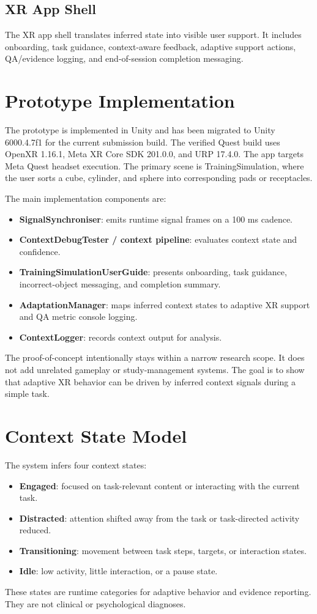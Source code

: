 \documentclass[conference]{IEEEtran}
\begin{document}
\subsection{XR App Shell}
The XR app shell translates inferred state into visible user support. It includes onboarding, task guidance, context-aware feedback, adaptive support actions, QA/evidence logging, and end-of-session completion messaging.

\section{Prototype Implementation}
The prototype is implemented in Unity and has been migrated to Unity 6000.4.7f1 for the current submission build. The verified Quest build uses OpenXR 1.16.1, Meta XR Core SDK 201.0.0, and URP 17.4.0. The app targets Meta Quest headset execution. The primary scene is TrainingSimulation, where the user sorts a cube, cylinder, and sphere into corresponding pads or receptacles.

The main implementation components are:
\begin{itemize}
\item \textbf{SignalSynchroniser}: emits runtime signal frames on a 100 ms cadence.
\item \textbf{ContextDebugTester / context pipeline}: evaluates context state and confidence.
\item \textbf{TrainingSimulationUserGuide}: presents onboarding, task guidance, incorrect-object messaging, and completion summary.
\item \textbf{AdaptationManager}: maps inferred context states to adaptive XR support and QA metric console logging.
\item \textbf{ContextLogger}: records context output for analysis.
\end{itemize}

The proof-of-concept intentionally stays within a narrow research scope. It does not add unrelated gameplay or study-management systems. The goal is to show that adaptive XR behavior can be driven by inferred context signals during a simple task.

\section{Context State Model}
The system infers four context states:
\begin{itemize}
\item \textbf{Engaged}: focused on task-relevant content or interacting with the current task.
\item \textbf{Distracted}: attention shifted away from the task or task-directed activity reduced.
\item \textbf{Transitioning}: movement between task steps, targets, or interaction states.
\item \textbf{Idle}: low activity, little interaction, or a pause state.
\end{itemize}
These states are runtime categories for adaptive behavior and evidence reporting. They are not clinical or psychological diagnoses.
\end{document}
